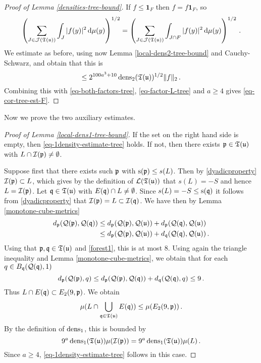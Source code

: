 {\begin{proof}[Proof of Lemma \ref{densities-tree-bound}]
    If $f \le \mathbf{1}_F$ then $f = f\mathbf{1}_F$, so
    $$
        \left( \sum_{J \in \mathcal{J}({\mathfrak T}({\mathfrak u}))} \int_J |f(y)|^2 \, \mathrm{d}\mu(y) \right)^{1/2} = \left( \sum_{J \in \mathcal{J}({\mathfrak T}({\mathfrak u}))} \int_{J \cap F} |f(y)|^2 \, \mathrm{d}\mu(y) \right)^{1/2}\,.
    $$
    We estimate as before, using now Lemma \ref{local-dens2-tree-bound} and Cauchy-Schwarz, and obtain that this is
    $$
        \le 2^{100a^3 + 10} \operatorname{\operatorname{dens}}_2({\mathfrak T}({\mathfrak u}))^{1/2} \|f\|_2\,.
    $$
    Combining this with \eqref{eq-both-factors-tree}, \eqref{eq-factor-L-tree} and $a \ge 4$ gives \eqref{eq-cor-tree-est-F}.
\end{proof}

Now we prove the two auxiliary estimates.

\begin{proof}[Proof of Lemma \ref{local-dens1-tree-bound}]
    If the set on the right hand side is empty, then \eqref{eq-1density-estimate-tree} holds. If not, then there exists ${\mathfrak p} \in {\mathfrak T}({\mathfrak u})$ with $L \cap {\mathcal{I}}({\mathfrak p}) \ne \emptyset$.

    Suppose first that there exists such ${\mathfrak p}$ with ${\mathrm{s}}({\mathfrak p}) \le s(L)$. Then by \eqref{dyadicproperty} ${\mathcal{I}}({\mathfrak p}) \subset L$, which gives by the definition of $\mathcal{L}({\mathfrak T}({\mathfrak u}))$ that $s(L) = -S$ and hence $L = {\mathcal{I}}({\mathfrak p})$. Let ${\mathfrak q} \in {\mathfrak T}({\mathfrak u})$ with $E({\mathfrak q}) \cap L \ne \emptyset$. Since $s(L) = -S \le {\mathrm{s}}({\mathfrak q})$ it follows from \eqref{dyadicproperty} that ${\mathcal{I}}({\mathfrak p}) = L \subset {\mathcal{I}}({\mathfrak q})$. We have then by Lemma \ref{monotone-cube-metrics}
    \begin{align*}
        d_{{\mathfrak p}}({\mathcal{Q}}({\mathfrak p}), {\mathcal{Q}}({\mathfrak q})) &\le d_{{\mathfrak p}}({\mathcal{Q}}({\mathfrak p}), {\mathcal{Q}}({\mathfrak u})) + d_{{\mathfrak p}}({\mathcal{Q}}({\mathfrak q}), {\mathcal{Q}}({\mathfrak u}))\\
        &\le d_{{\mathfrak p}}({\mathcal{Q}}({\mathfrak p}), {\mathcal{Q}}({\mathfrak u})) + d_{{\mathfrak q}}({\mathcal{Q}}({\mathfrak q}), {\mathcal{Q}}({\mathfrak u}))\,.
    \end{align*}
    Using that ${\mathfrak p}, {\mathfrak q} \in {\mathfrak T}({\mathfrak u})$ and \eqref{forest1}, this is at most $8$. Using again the triangle inequality and Lemma \ref{monotone-cube-metrics}, we obtain that for each $q \in B_{{\mathfrak q}}({\mathcal{Q}}({\mathfrak q}), 1)$
    $$
        d_{{\mathfrak p}}({\mathcal{Q}}({\mathfrak p}), q) \le d_{{\mathfrak p}}({\mathcal{Q}}({\mathfrak p}), {\mathcal{Q}}({\mathfrak q})) + d_{{\mathfrak q}}({\mathcal{Q}}({\mathfrak q}), q) \le 9\,.
    $$
    Thus $L \cap E({\mathfrak q}) \subset E_2(9, {\mathfrak p})$. We obtain
    $$
        \mu(L \cap \bigcup_{{\mathfrak q} \in {\mathfrak T}({\mathfrak u})} E({\mathfrak q})) \le \mu(E_2(9, {\mathfrak p}))\,.
    $$
    By the definition of $\operatorname{\operatorname{dens}}_1$, this is bounded by
    $$
        9^a \operatorname{\operatorname{dens}}_1({\mathfrak T}({\mathfrak u})) \mu({\mathcal{I}}({\mathfrak p})) =9^a \operatorname{\operatorname{dens}}_1({\mathfrak T}({\mathfrak u})) \mu(L)\,.
    $$
    Since $a \ge 4$, \eqref{eq-1density-estimate-tree} follows in this case.


\end{proof}}
